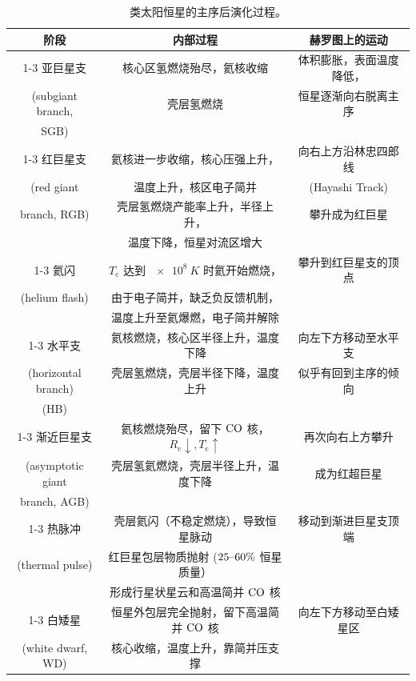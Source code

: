 \documentclass[../天体物理基础.tex]{subfiles}
\begin{document}
\begin{table}[!htbp]
\centering
\caption{类太阳恒星的主序后演化过程。}
\begin{tabular}{c c c}
\hline
阶段 & 内部过程 & 赫罗图上的运动\\
\cline{1-3}
亚巨星支 & 核心区氢燃烧殆尽，氦核收缩 & 体积膨胀，表面温度降低，\\
(subgiant branch, & 壳层氢燃烧 & 恒星逐渐向右脱离主序\\
SGB) & & \\
\cline{1-3}
红巨星支 & 氦核进一步收缩，核心压强上升，& 向右上方沿林忠四郎线\\
(red giant & 温度上升，核区电子简并 & (Hayashi Track)\\
branch, RGB) & 壳层氢燃烧产能率上升，半径上升，& 攀升成为红巨星\\
 & 温度下降，恒星对流区增大 & \\
\cline{1-3}
氦闪 & $T_{\mathrm{c}}$ 达到 $\qty{e8}{K}$ 时氦开始燃烧，& 攀升到红巨星支的顶点\\
(helium flash) & 由于电子简并，缺乏负反馈机制，& \\
 & 温度上升至氦爆燃，电子简并解除 & \\
\cline{1-3}
水平支 & 氦核燃烧，核心区半径上升，温度下降 & 向左下方移动至水平支\\
(horizontal branch) & 壳层氢燃烧，壳层半径下降，温度上升 & 似乎有回到主序的倾向\\
(HB) & & \\
\cline{1-3}
渐近巨星支 & 氦核燃烧殆尽，留下 $\ce{CO}$ 核，$R_{\mathrm{c}}\downarrow, T_{\mathrm{c}}\uparrow$ & 再次向右上方攀升\\
(asymptotic giant & 壳层氢氦燃烧，壳层半径上升，温度下降 & 成为红超巨星\\
branch, AGB) & & \\
\cline{1-3}
热脉冲 & 壳层氦闪（不稳定燃烧），导致恒星脉动 & 移动到渐进巨星支顶端\\
(thermal pulse) & 红巨星包层物质抛射 ($25\text{\textendash}60\%$ 恒星质量）& \\
 & 形成行星状星云和高温简并 $\ce{CO}$ 核 & \\
\cline{1-3}
白矮星 & 恒星外包层完全抛射，留下高温简并 $\ce{CO}$ 核 & 向左下方移动至白矮星区\\
(white dwarf, WD) & 核心收缩，温度上升，靠简并压支撑 & \\
\hline
\end{tabular}
\label{类太阳恒星的主序后演化过程。}
\end{table} 
\end{document}
